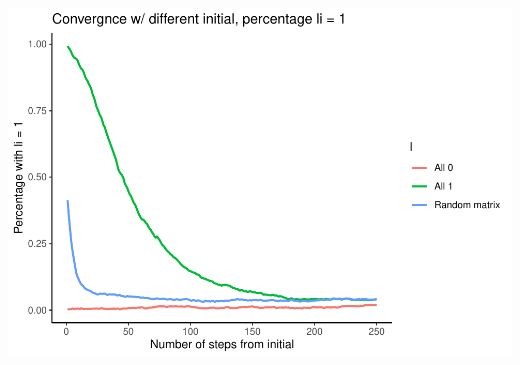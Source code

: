\documentclass[
]{article}
\begin{document}
\includegraphics{Ex3_files/figure-latex/unnamed-chunk-9-1.pdf}
\end{document}
